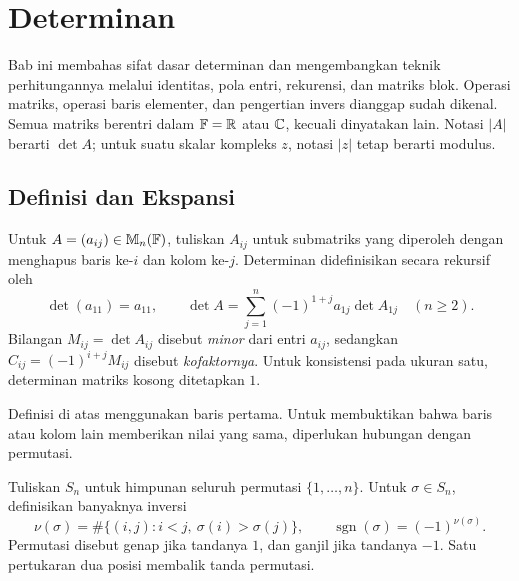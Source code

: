 \chapter{Determinan}
\label{ch:determinan}

Bab ini membahas sifat dasar determinan dan mengembangkan teknik
perhitungannya melalui identitas, pola entri, rekurensi, dan matriks blok.
Operasi matriks, operasi baris elementer, dan pengertian invers dianggap
sudah dikenal. Semua matriks berentri dalam $\mathbb{F}=\mathbb{R}$ atau $\mathbb{C}$, kecuali
dinyatakan lain. Notasi $|A|$ berarti $\det A$; untuk suatu skalar
kompleks $z$, notasi $|z|$ tetap berarti modulus.

\section{Definisi dan Ekspansi}
\label{det:ekspansi}

\begin{defi}
      Untuk $A=(a_{ij})\in\mathbb{M}_n(\mathbb{F})$, tuliskan $A_{ij}$ untuk submatriks
      yang diperoleh dengan menghapus baris ke-$i$ dan kolom ke-$j$.
      Determinan didefinisikan secara rekursif oleh
      \[
            \det(a_{11})=a_{11},\qquad
            \det A=\sum_{j=1}^n(-1)^{1+j}a_{1j}\det A_{1j}\quad(n\ge2).
      \]
      Bilangan $M_{ij}=\det A_{ij}$ disebut \emph{minor} dari entri $a_{ij}$,
      sedangkan $C_{ij}=(-1)^{i+j}M_{ij}$ disebut \emph{kofaktornya}.
      Untuk konsistensi pada ukuran satu, determinan matriks kosong ditetapkan $1$.
\end{defi}

Definisi di atas menggunakan baris pertama. Untuk membuktikan bahwa
baris atau kolom lain memberikan nilai yang sama, diperlukan hubungan
dengan permutasi.

\begin{defi}
      Tuliskan $S_n$ untuk himpunan seluruh permutasi $\{1,\ldots,n\}$.
      Untuk $\sigma\in S_n$, definisikan banyaknya inversi
      \[
            \nu(\sigma)=\#\{(i,j):i<j,\ \sigma(i)>\sigma(j)\},
            \qquad \operatorname{sgn}(\sigma)=(-1)^{\nu(\sigma)}.
      \]
      Permutasi disebut genap jika tandanya $1$, dan ganjil jika tandanya $-1$.
      Satu pertukaran dua posisi membalik tanda permutasi.
\end{defi}

